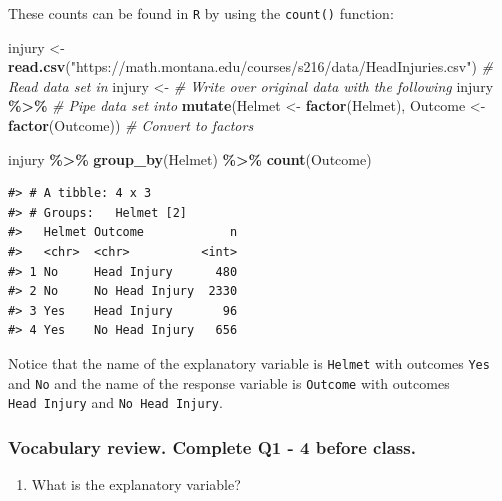 \documentclass[
]{report}
\newenvironment{Shaded}{\begin{snugshade}}{\end{snugshade}}
\newcommand{\CommentTok}[1]{\textcolor[rgb]{0.56,0.35,0.01}{\textit{#1}}}
\newcommand{\KeywordTok}[1]{\textcolor[rgb]{0.13,0.29,0.53}{\textbf{#1}}}
\newcommand{\NormalTok}[1]{#1}
\newcommand{\OperatorTok}[1]{\textcolor[rgb]{0.81,0.36,0.00}{\textbf{#1}}}
\newcommand{\StringTok}[1]{\textcolor[rgb]{0.31,0.60,0.02}{#1}}
\providecommand{\tightlist}{%
  \setlength{\itemsep}{0pt}\setlength{\parskip}{0pt}}
\begin{document}
These counts can be found in \texttt{R} by using the \texttt{count()} function:

\begin{Shaded}
\begin{Highlighting}[]
\NormalTok{injury \textless{}{-}}\StringTok{ }\KeywordTok{read.csv}\NormalTok{(}\StringTok{"https://math.montana.edu/courses/s216/data/HeadInjuries.csv"}\NormalTok{) }\CommentTok{\# Read data set in}
\NormalTok{injury \textless{}{-}}\StringTok{ }\CommentTok{\# Write over original data with the following}
\StringTok{  }\NormalTok{injury }\OperatorTok{\%\textgreater{}\%}\StringTok{ }\CommentTok{\# Pipe data set into}
\StringTok{  }\KeywordTok{mutate}\NormalTok{(Helmet \textless{}{-}}\StringTok{ }\KeywordTok{factor}\NormalTok{(Helmet),}
\NormalTok{         Outcome \textless{}{-}}\StringTok{ }\KeywordTok{factor}\NormalTok{(Outcome)) }\CommentTok{\# Convert to factors}

\NormalTok{injury }\OperatorTok{\%\textgreater{}\%}\StringTok{ }\KeywordTok{group\_by}\NormalTok{(Helmet) }\OperatorTok{\%\textgreater{}\%}\StringTok{ }\KeywordTok{count}\NormalTok{(Outcome)}
\end{Highlighting}
\end{Shaded}

\begin{verbatim}
#> # A tibble: 4 x 3
#> # Groups:   Helmet [2]
#>   Helmet Outcome            n
#>   <chr>  <chr>          <int>
#> 1 No     Head Injury      480
#> 2 No     No Head Injury  2330
#> 3 Yes    Head Injury       96
#> 4 Yes    No Head Injury   656
\end{verbatim}

Notice that the name of the explanatory variable is \texttt{Helmet} with outcomes \texttt{Yes} and \texttt{No} and the name of the response variable is \texttt{Outcome} with outcomes \texttt{Head\ Injury} and \texttt{No\ Head\ Injury}.

\hypertarget{vocabulary-review.-complete-q1---4-before-class.-1}{%
\subsubsection*{Vocabulary review. Complete Q1 - 4 before class.}\label{vocabulary-review.-complete-q1---4-before-class.-1}}

\begin{enumerate}
\def\labelenumi{\arabic{enumi}.}
\tightlist
\item
  What is the explanatory variable?
\end{enumerate}
\end{document}
